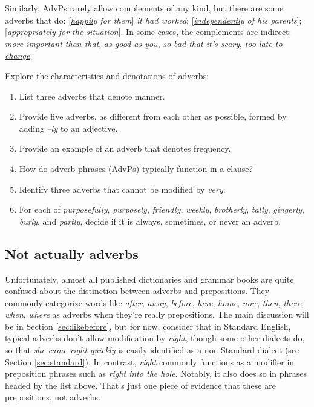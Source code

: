 Similarly, AdvPs rarely allow complements of any kind, but there are some adverbs that do: [\textit{\uline{happily} for them}]\textit{ it had worked}; [\textit{\uline{independently} of his parents}]; [\textit{\uline{appropriately} for the situation}]. In some cases, the complements are indirect: \textit{\uline{more} important \uline{than that}}, \textit{\uline{as} good \uline{as you}}, \textit{\uline{so} bad \uline{that it's scary}}, \textit{\uline{too} late \uline{to change}}.

\begin{tcolorbox}[title=Practice, colback=white]
Explore the characteristics and denotations of adverbs:
\begin{enumerate}
    \item List three adverbs that denote manner.
    \item Provide five adverbs, as different from each other as possible, formed by adding \textit{--ly} to an adjective.
    \item Provide an example of an adverb that denotes frequency.
    \item How do adverb phrases (AdvPs) typically function in a clause?
    \item Identify three adverbs that cannot be modified by  \textit{very}.
    \item For each of \textit{purposefully}, \textit{purposely}, \textit{friendly}, \textit{weekly}, \textit{brotherly}, \textit{tally}, \textit{gingerly}, \textit{burly}, and \textit{partly}, decide if it is always, sometimes, or never an adverb.
\end{enumerate}
\end{tcolorbox}

\subsection{Not actually adverbs}
Unfortunately, almost all published dictionaries and grammar books are quite confused about the distinction between adverbs and prepositions. They commonly categorize words like \textit{after}, \textit{away}, \textit{before}, \textit{here}, \textit{home}, \textit{now}, \textit{then}, \textit{there}, \textit{when}, \textit{where} as adverbs when they're really prepositions. The main discussion will be in Section \ref{sec:likebefore}, but for now, consider that in Standard English, typical adverbs don't allow modification by \textit{right}, though some other dialects do, so that \textit{she came right quickly} is easily identified as a non-Standard dialect (see Section \ref{sec:standard}). In contrast, \textit{right} commonly functions as a modifier in preposition phrases such as \textit{right into the hole}. Notably, it also does so in phrases headed by the list above. That's just one piece of evidence that these are prepositions, not adverbs.

